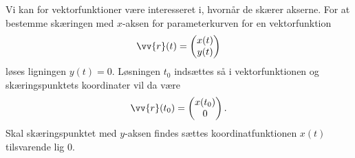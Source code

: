 Vi kan for vektorfunktioner være interesseret i, hvornår de skærer akserne. For at bestemme skæringen med $x$-aksen for parameterkurven for en vektorfunktion 
\begin{align*}
	\vv{r}(t) = 
	\begin{pmatrix}
		x(t)\\
		y(t)
	\end{pmatrix}
\end{align*}
løses ligningen $y(t)=0$. Løsningen $t_0$ indsættes så i vektorfunktionen og skæringspunktets koordinater vil da være
\begin{align*}
	\vv{r}(t_0) = 
	\begin{pmatrix}
		x(t_0) \\
		0
	\end{pmatrix}.
\end{align*} 
Skal skæringspunktet med $y$-aksen findes sættes koordinatfunktionen $x(t)$ tilsvarende lig $0$. 

